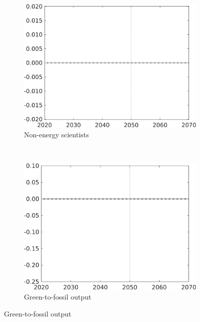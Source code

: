 \begin{figure}[h!!!]
	\begin{subfigure}{0.4\textwidth}
		\caption{Non-energy scientists}
		\includegraphics[width=1\textwidth]{../../codding_model/own_basedOnFried/optimalPol_010922_revision/figures/all_13Sept22_Tplus30/CountTAUFPerDif_Opt_target_sn_nsk1_xgr0_knspil0_regime4_spillover0_sep0_extern0_PV1_etaa0.79.png}
	\end{subfigure}
\begin{minipage}[]{0.1\textwidth}
\
\end{minipage}
	\begin{subfigure}{0.4\textwidth}
		\caption{Green-to-fossil output}
		\includegraphics[width=1\textwidth]{../../codding_model/own_basedOnFried/optimalPol_010922_revision/figures/all_13Sept22_Tplus30/CountTAUFPerDif_Opt_target_GFF_nsk1_xgr0_knspil0_regime4_spillover0_sep0_extern0_PV1_etaa0.79.png}
	\end{subfigure}
\end{figure}

